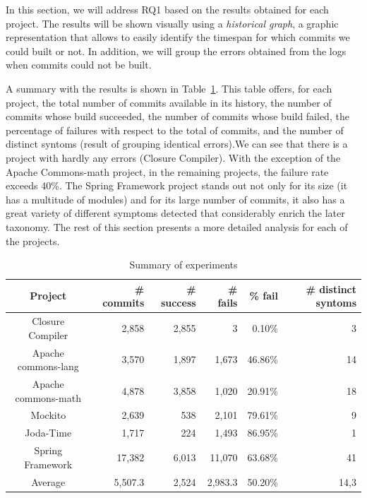 In this section, we will address RQ1 based on the results obtained for each project.
The results will be shown visually using a \emph{historical graph}, a graphic representation that allows to easily identify the timespan for which commits we could built or not.
In addition, we will group the errors obtained from the logs when commits could not be built.

A summary with the results is shown in Table~\ref{table:allResults}.
This table offers, for each project, the total number of commits available in its history, the number of commits whose build succeeded, the number of commits whose build failed, the percentage of failures with respect to the total of commits, and the number of distinct syntoms (result of grouping identical errors).We can see that there is a project with hardly any errors (Closure Compiler). With the exception of the Apache Commons-math project, in the remaining projects, the failure rate exceeds 40\%. The Spring Framework project stands out not only for its size (it has a multitude of modules) and for its large number of commits, it also has a great variety of different symptoms detected that considerably enrich the later taxonomy.
The rest of this section presents a more detailed analysis for each of the projects.

\begin{table}[h]
	\caption{Summary of experiments}
	\label{table:allResults}
	\begin{center}
	\begin{tabular}{crrrrr}
		\toprule
		\bf{Project} & \bf{\# commits} & \bf{\# success} & \bf{\# fails} & \bf{\% fail} & \bf{\# distinct syntoms}\\ 
		\midrule
		Closure Compiler & 2,858 & 2,855 & 3 & 0.10\% & 3\\
		Apache commons-lang & 3,570 & 1,897 & 1,673 & 46.86\% & 14\\
		Apache commons-math & 4,878 & 3,858 & 1,020 & 20.91\% & 18 \\
		Mockito & 2,639 & 538 & 2,101 & 79.61\% & 9 \\
		Joda-Time & 1,717 & 224 & 1,493 & 86.95\% & 1 \\
		Spring Framework & 17,382 & 6,013 & 11,070 & 63.68\% & 41\\
		\midrule
		Average & 5,507.3 & 2,524 & 2,983.3 & 50.20\% & 14,3 \\
		\bottomrule
	\end{tabular}
	\end{center}
\end{table}

